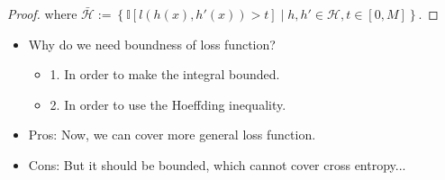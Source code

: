 {\begin{proof}
where $\bar{\mathcal{H}}:=\left\{\mathbb{I}[l(h(x),h'(x))>t]\middle|h,h'\in\mathcal{H}, t \in [0,M]\right\}$.
\end{proof}
\begin{itemize}
    \item Why do we need boundness of loss function? 
    \begin{itemize}
        \item 1. In order to make the integral bounded.
        \item 2. In order to use the Hoeffding inequality.
    \end{itemize}
    \item Pros: Now, we can cover more general loss function.
    \item Cons: But it should be bounded, which cannot cover cross entropy...
\end{itemize}
}
\fi